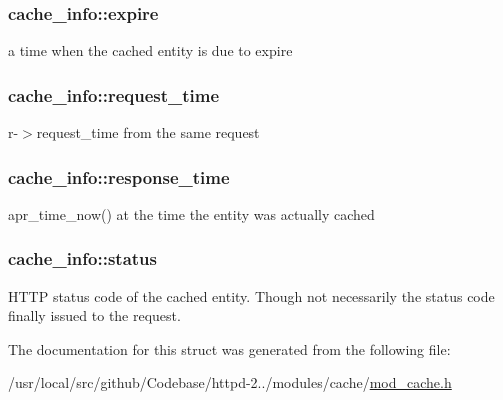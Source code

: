 \subsubsection[{\texorpdfstring{expire}{expire}}]{ cache\+\_\+info\+::expire}\hypertarget{structcache__info_acad1125058221e40207cc515f294d474}{}\label{structcache__info_acad1125058221e40207cc515f294d474}
a time when the cached entity is due to expire 
\subsubsection[{\texorpdfstring{request\+\_\+time}{request_time}}]{ cache\+\_\+info\+::request\+\_\+time}\hypertarget{structcache__info_acb92f8dc9faf851f946e958a0274cd05}{}\label{structcache__info_acb92f8dc9faf851f946e958a0274cd05}
r-\/$>$request\+\_\+time from the same request 
\subsubsection[{\texorpdfstring{response\+\_\+time}{response_time}}]{ cache\+\_\+info\+::response\+\_\+time}\hypertarget{structcache__info_acc033d51cff12d80bb7a58a97d50cf1a}{}\label{structcache__info_acc033d51cff12d80bb7a58a97d50cf1a}
apr\+\_\+time\+\_\+now() at the time the entity was actually cached 
\subsubsection[{\texorpdfstring{status}{status}}]{ cache\+\_\+info\+::status}\hypertarget{structcache__info_a75f7c612cf3860fa84fbadb0083d2194}{}\label{structcache__info_a75f7c612cf3860fa84fbadb0083d2194}
H\+T\+TP status code of the cached entity. Though not necessarily the status code finally issued to the request. 

The documentation for this struct was generated from the following file\+:\begin{DoxyCompactItemize}
\item 
/usr/local/src/github/\+Codebase/httpd-\/2../modules/cache/\hyperlink{mod__cache_8h}{mod\+\_\+cache.\+h}\end{DoxyCompactItemize}
